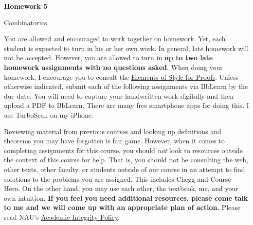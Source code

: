 \documentclass[11pt]{article}%
\theoremstyle{definition}
\newcommand{\blankline}{\pagebreak[2]\vspace{.5\baselineskip}}
\begin{document}
\begin{center}
{\Large\bf Homework 5}

\smallskip

Combinatorics
\end{center}

\thispagestyle{fancy}

You are allowed and encouraged to work together on homework. Yet, each student is expected to turn in his or her own work. In general, late homework will not be accepted. However, you are allowed to turn in \textbf{up to two late homework assignments with no questions asked}. When doing your homework, I encourage you to consult the \href{http://danaernst.com/teaching/ElementsOfStyle.pdf}{Elements of Style for Proofs}. Unless otherwise indicated, submit each of the following assignments via BbLearn by the due date. You will need to capture your handwritten work digitally and then upload a PDF to BbLearn. There are many free smartphone apps for doing this. I use TurboScan on my iPhone.

\blankline

Reviewing material from previous courses and looking up definitions and theorems you may have forgotten is fair game. However, when it comes to completing assignments for this course, you should \emph{not} look to resources outside the context of this course for help.  That is, you should not be consulting the web, other texts, other faculty, or students outside of our course in an attempt to find solutions to the problems you are assigned.  This includes Chegg and Course Hero. On the other hand, you may use each other, the textbook, me, and your own intuition. \textbf{If you feel you need additional resources, please come talk to me and we will come up with an appropriate plan of action.} Please read NAU's \href{https://www5.nau.edu/policies/Client/Details/828?whoIsLooking=Students&pertainsTo=All&sortDirection=Ascending&page=1}{Academic Integrity Policy}.

\blankline
\end{document}

